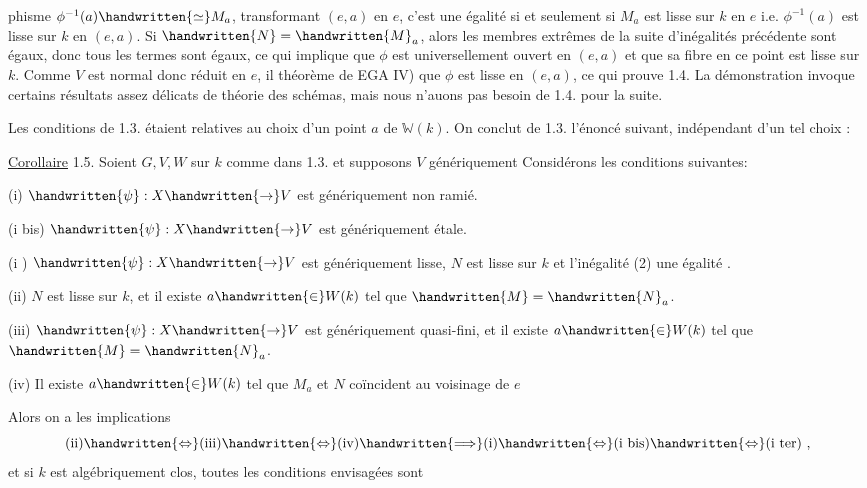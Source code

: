 %
%
phisme $\phi^{-1}(a)\handwritten{\simeq}M_a$, transformant $(e,a)$ en $e$, c'est une égalité si et seulement si $M_a$ est  lisse sur $k$ en $e$ i.e. $\phi^{-1}(a)$ est lisse sur $k$ en $(e,a)$. Si  $\handwritten{N}=\handwritten{M}_a$, alors les membres extrêmes de la suite d'inégalités précédente sont égaux, donc tous les termes sont égaux, ce qui implique que $\phi$ est universellement ouvert en $(e,a)$ et que sa fibre en ce point est lisse sur $k$. Comme $V$ est  normal donc réduit en $e$, il  théorème de EGA IV) que $\phi$ est lisse  en $(e,a)$, ce qui prouve 1.4. La démonstration invoque certains résultats assez délicats de  théorie des schémas,  mais nous n'auons pas besoin de 1.4. pour la suite.

Les conditions de 1.3. étaient relatives au choix d'un point $a$ de $\mathbb{W}(k)$. On conclut de 1.3. l'énoncé suivant, indépendant d'un tel choix :

\uline{Corollaire} 1.5. Soient $G,V,W$ sur $k$ comme dans 1.3.  et supposons $V$ génériquement  Considérons les conditions suivantes:

(i)  $\handwritten{\psi}:X\handwritten{\to}V$ est génériquement non ramié.

(i bis) $\handwritten{\psi}:X\handwritten{\to}V$ est génériquement étale.

(i ) $\handwritten{\psi}:X\handwritten{\to}V$ est génériquement lisse, $N$ est lisse sur $k$ et l'inégalité (2) une égalité .

(ii)  $N$ est lisse sur $k$, et il existe $a\handwritten{\in}W(k)$ tel que $\handwritten{M}=\handwritten{N}_a$.

(iii) $\handwritten{\psi}:X\handwritten{\to}V$ est génériquement quasi-fini, et il existe $a\handwritten{\in}W(k)$ tel que $\handwritten{M}=\handwritten{N}_a$.

(iv) Il existe $a\handwritten{\in}W(k)$ tel que $M_a$ et $N$ coïncident au voisinage de $e$

Alors on a les implications
\[
\text{(ii)}\handwritten{\Leftrightarrow}\text{(iii)}\handwritten{\Leftrightarrow}\text{(iv)}
\handwritten{\Longrightarrow}\text{(i)}\handwritten{\Leftrightarrow}\text{(i bis)}\handwritten{\Leftrightarrow}\text{(i ter)}\ ,
\]
et si $k$ est algébriquement clos, toutes les conditions envisagées sont
